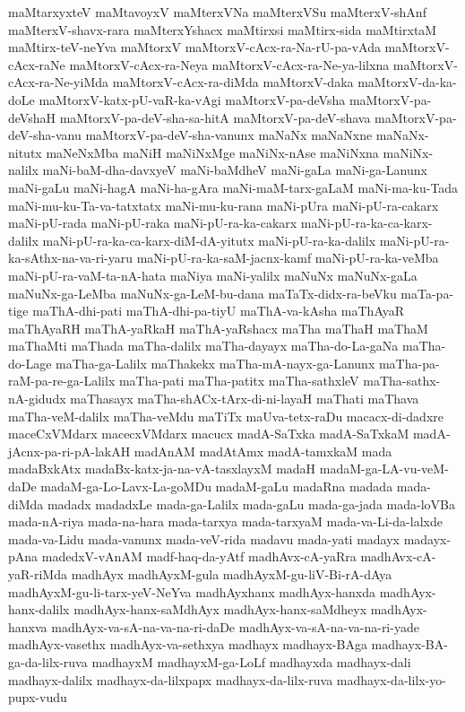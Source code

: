{maMtarxyxteV
maMtavoyxV
maMterxVNa
maMterxVSu
maMterxV-shAnf
maMterxV-shavx-rara
maMterxYshacx
maMtirxsi
maMtirx-sida
maMtirxtaM
maMtirx-teV-neYva
maMtorxV
maMtorxV-cAcx-ra-Na-rU-pa-vAda
maMtorxV-cAcx-raNe
maMtorxV-cAcx-ra-Neya
maMtorxV-cAcx-ra-Ne-ya-lilxna
maMtorxV-cAcx-ra-Ne-yiMda
maMtorxV-cAcx-ra-diMda
maMtorxV-daka
maMtorxV-da-ka-doLe
maMtorxV-katx-pU-vaR-ka-vAgi
maMtorxV-pa-deVsha
maMtorxV-pa-deVshaH
maMtorxV-pa-deV-sha-sa-hitA
maMtorxV-pa-deV-shava
maMtorxV-pa-deV-sha-vanu
maMtorxV-pa-deV-sha-vanunx
maNaNx
maNaNxne
maNaNx-nitutx
maNeNxMba
maNiH
maNiNxMge
maNiNx-nAse
maNiNxna
maNiNx-nalilx
maNi-baM-dha-davxyeV
maNi-baMdheV
maNi-gaLa
maNi-ga-Lanunx
maNi-gaLu
maNi-hagA
maNi-ha-gAra
maNi-maM-tarx-gaLaM
maNi-ma-ku-Tada
maNi-mu-ku-Ta-va-tatxtatx
maNi-mu-ku-rana
maNi-pUra
maNi-pU-ra-cakarx
maNi-pU-rada
maNi-pU-raka
maNi-pU-ra-ka-cakarx
maNi-pU-ra-ka-ca-karx-dalilx
maNi-pU-ra-ka-ca-karx-diM-dA-yitutx
maNi-pU-ra-ka-dalilx
maNi-pU-ra-ka-sAthx-na-va-ri-yaru
maNi-pU-ra-ka-saM-jacnx-kamf
maNi-pU-ra-ka-veMba
maNi-pU-ra-vaM-ta-nA-hata
maNiya
maNi-yalilx
maNuNx
maNuNx-gaLa
maNuNx-ga-LeMba
maNuNx-ga-LeM-bu-dana
maTaTx-didx-ra-beVku
maTa-pa-tige
maThA-dhi-pati
maThA-dhi-pa-tiyU
maThA-va-kAsha
maThAyaR
maThAyaRH
maThA-yaRkaH
maThA-yaRshacx
maTha
maThaH
maThaM
maThaMti
maThada
maTha-dalilx
maTha-dayayx
maTha-do-La-gaNa
maTha-do-Lage
maTha-ga-Lalilx
maThakekx
maTha-mA-nayx-ga-Lanunx
maTha-pa-raM-pa-re-ga-Lalilx
maTha-pati
maTha-patitx
maTha-sathxleV
maTha-sathx-nA-gidudx
maThasayx
maTha-shACx-tArx-di-ni-layaH
maThati
maThava
maTha-veM-dalilx
maTha-veMdu
maTiTx
maUva-tetx-raDu
macacx-di-dadxre
maceCxVMdarx
macecxVMdarx
macucx
madA-SaTxka
madA-SaTxkaM
madA-jAcnx-pa-ri-pA-lakAH
madAnAM
madAtAmx
madA-tamxkaM
mada
madaBxkAtx
madaBx-katx-ja-na-vA-tasxlayxM
madaH
madaM-ga-LA-vu-veM-daDe
madaM-ga-Lo-Lavx-La-goMDu
madaM-gaLu
madaRna
madada
mada-diMda
madadx
madadxLe
mada-ga-Lalilx
mada-gaLu
mada-ga-jada
mada-loVBa
mada-nA-riya
mada-na-hara
mada-tarxya
mada-tarxyaM
mada-va-Li-da-lalxde
mada-va-Lidu
mada-vanunx
mada-veV-rida
madavu
mada-yati
madayx
madayx-pAna
madedxV-vAnAM
madf-haq-da-yAtf
madhAvx-cA-yaRra
madhAvx-cA-yaR-riMda
madhAyx
madhAyxM-gula
madhAyxM-gu-liV-Bi-rA-dAya
madhAyxM-gu-li-tarx-yeV-NeYva
madhAyxhanx
madhAyx-hanxda
madhAyx-hanx-dalilx
madhAyx-hanx-saMdhAyx
madhAyx-hanx-saMdheyx
madhAyx-hanxva
madhAyx-va-sA-na-va-na-ri-daDe
madhAyx-va-sA-na-va-na-ri-yade
madhAyx-vasethx
madhAyx-va-sethxya
madhayx
madhayx-BAga
madhayx-BA-ga-da-lilx-ruva
madhayxM
madhayxM-ga-LoLf
madhayxda
madhayx-dali
madhayx-dalilx
madhayx-da-lilxpapx
madhayx-da-lilx-ruva
madhayx-da-lilx-yo-pupx-vudu
}
